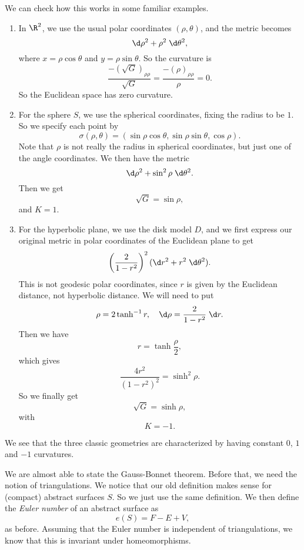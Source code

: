 \documentclass[a4paper]{article}
\begin{document}
We can check how this works in some familiar examples.
\begin{eg}\leavevmode
  \begin{enumerate}
    \item In $\R^2$, we use the usual polar coordinates $(\rho, \theta)$, and the metric becomes
      \[
        \d \rho^2 + \rho^2 \;\d \theta^2,
      \]
      where $x = \rho \cos \theta$ and $y = \rho \sin \theta$. So the curvature is
      \[
        \frac{-(\sqrt{G})_{\rho\rho}}{\sqrt{G}} = \frac{-(\rho)_{\rho\rho}}{\rho} = 0.
      \]
     So the Euclidean space has zero curvature.
   \item For the sphere $S$, we use the spherical coordinates, fixing the radius to be $1$. So we specify each point by
     \[
       \sigma(\rho, \theta) = (\sin \rho \cos \theta, \sin \rho \sin \theta, \cos \rho).
     \]
     Note that $\rho$ is not really the radius in spherical coordinates, but just one of the angle coordinates. We then have the metric
     \[
       \d \rho^2 + \sin^2 \rho \;\d \theta^2.
     \]
     Then we get
     \[
       \sqrt{G} = \sin \rho,
     \]
     and $K = 1$.
   \item For the hyperbolic plane, we use the disk model $D$, and we first express our original metric in polar coordinates of the Euclidean plane to get
     \[
       \left(\frac{2}{1 - r^2}\right)^2 (\d r^2 + r^2 \;\d \theta^2).
     \]
     This is not geodesic polar coordinates, since $r$ is given by the Euclidean distance, not hyperbolic distance. We will need to put
     \[
       \rho = 2\tanh^{-1} r,\quad \d \rho = \frac{2}{1 - r^2}\;\d r.
     \]
     Then we have
     \[
       r = \tanh \frac{\rho}{2},
     \]
     which gives
     \[
       \frac{4r^2}{(1 - r^2)^2} = \sinh^2 \rho.
     \]
     So we finally get
     \[
       \sqrt{G} = \sinh \rho,
     \]
     with
     \[
       K = -1.
     \]
  \end{enumerate}
\end{eg}
We see that the three classic geometries are characterized by having constant $0$, $1$ and $-1$ curvatures.

We are almost able to state the Gauss-Bonnet theorem. Before that, we need the notion of triangulations. We notice that our old definition makes sense for (compact) abstract surfaces $S$. So we just use the same definition. We then define the \emph{Euler number} of an abstract surface as
\[
  e(S) = F - E + V,
\]
as before. Assuming that the Euler number is independent of triangulations, we know that this is invariant under homeomorphisms.
\end{document}
